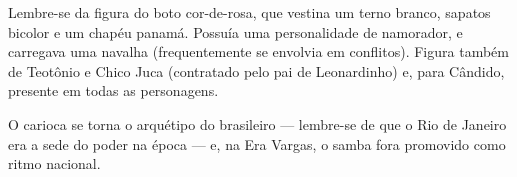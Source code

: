 Lembre-se da figura do boto cor-de-rosa, que vestina um terno branco, sapatos bicolor e um chapéu panamá. Possuía uma personalidade de namorador, e carregava uma navalha (frequentemente se envolvia em conflitos). Figura também de Teotônio e Chico Juca (contratado pelo pai de Leonardinho) e, para Cândido, presente em todas as personagens.

O carioca se torna o arquétipo do brasileiro — lembre-se de que o Rio de Janeiro era a sede do poder na época — e, na Era Vargas, o samba fora promovido como ritmo nacional.